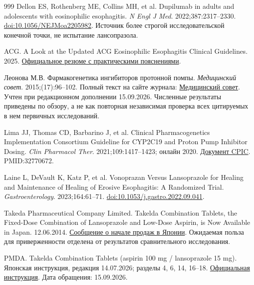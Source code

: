 \documentclass[11pt,a4paper,notitlepage]{report}
\begin{document}
\begin{thebibliography}{999}
 Dellon ES, Rothenberg ME, Collins MH, et al. Dupilumab in adults and adolescents with eosinophilic esophagitis. \textit{N Engl J Med}. 2022;387:2317--2330. \href{https://doi.org/10.1056/NEJMoa2205982}{doi:10.1056/NEJMoa2205982}. Источник более строгой исследовательской конечной точки, не испытание лансопразола.

 ACG. A Look at the Updated ACG Eosinophilic Esophagitis Clinical Guidelines. 2025. \href{https://gi.org/journals-publications/ebgi/eluri_feb2025/}{Официальное резюме с практическими пояснениями}.

 Леонова М.В. Фармакогенетика ингибиторов протонной помпы. \textit{Медицинский совет}. 2015;(17):96--102. Полный текст на сайте журнала: \href{https://www.med-sovet.pro/jour/article/view/433/433}{Медицинский совет}. Учтен при редакционном дополнении 15.09.2026. Численные результаты приведены по обзору, а не как повторная независимая проверка всех цитируемых в нем первичных исследований.

 Lima JJ, Thomas CD, Barbarino J, et al. Clinical Pharmacogenetics Implementation Consortium Guideline for CYP2C19 and Proton Pump Inhibitor Dosing. \textit{Clin Pharmacol Ther}. 2021;109:1417--1423; онлайн 2020. \href{https://files.cpicpgx.org/data/guideline/publication/PPI/2020/32770672.pdf}{Документ CPIC}. PMID:32770672.

 Laine L, DeVault K, Katz P, et al. Vonoprazan Versus Lansoprazole for Healing and Maintenance of Healing of Erosive Esophagitis: A Randomized Trial. \textit{Gastroenterology}. 2023;164:61--71. \href{https://doi.org/10.1053/j.gastro.2022.09.041}{doi:10.1053/j.gastro.2022.09.041}.

 Takeda Pharmaceutical Company Limited. Takelda Combination Tablets, the Fixed-Dose Combination of Lansoprazole and Low-Dose Aspirin, is Now Available in Japan. 12.06.2014. \href{https://www.takeda.com/newsroom/newsreleases/2014/takelda-combination-tablets-the-fixed-dose-combination-of-lansoprazole-and-low-dose-aspirin-is-now-available-in-japan/}{Сообщение о начале продаж в Японии}. Ожидаемая польза для приверженности отделена от результатов сравнительного исследования.

 PMDA. Takelda Combination Tablets (aspirin 100 mg / lansoprazole 15 mg). Японская инструкция, редакция 14.07.2026; разделы 4, 6, 14, 16--18. \href{https://www.pmda.go.jp/PmdaSearch/iyakuDetail/400061_3399102F1026_2_09}{Официальная инструкция}. Дата обращения: 15.09.2026.


\end{thebibliography}
\end{document}
